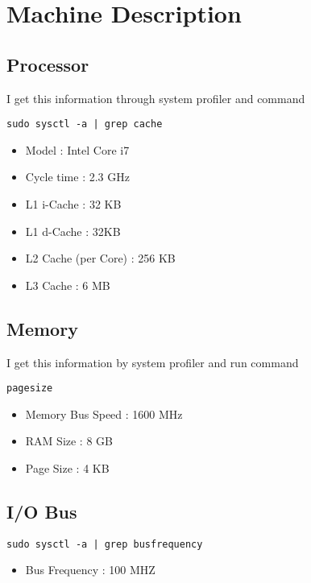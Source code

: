 \chapter[Machine Description]{Machine Description}

\section{Processor}

I get this information through system profiler and command 
\begin{verbatim}
sudo sysctl -a | grep cache
\end{verbatim}

\begin{itemize}
\item Model : Intel Core i7
\item Cycle time : 2.3 GHz
\item L1 i-Cache : 32 KB
\item L1 d-Cache : 32KB
\item L2 Cache (per Core) : 256 KB
\item L3 Cache : 6 MB
\end{itemize}

\section{Memory}
I get this information by system profiler and run command
\begin{verbatim}
pagesize
\end{verbatim}

\begin{itemize}
\item Memory Bus Speed : 1600 MHz
\item RAM Size : 8 GB
\item Page Size : 4 KB
\end{itemize}

\section{I/O Bus}
\begin{verbatim}
sudo sysctl -a | grep busfrequency
\end{verbatim}

\begin{itemize}
\item Bus Frequency : 100 MHZ
\end{itemize}


